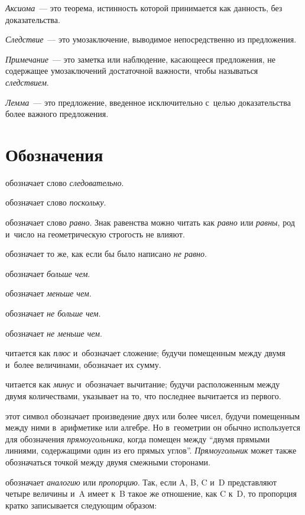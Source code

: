 \documentclass[letters,booklanguage=russian]{byrnebook}
\begin{document}
\emph{Аксиома}~— это теорема, истинность которой принимается как данность, без доказательства.

\emph{Следствие}~— это умозаключение, выводимое непосредственно из предложения.

\emph{Примечание}~— это заметка или наблюдение, касающееся предложения, не содержащее умозаключений достаточной важности, чтобы называться \emph{следствием}.

\emph{Лемма}~— это предложение, введенное исключительно с~целью доказательства более важного предложения.

\vfill\pagebreak

\chapter*{Обозначения}

\symb{$\therefore$}
 обозначает слово \emph{следовательно}.

\symb{$\because$}
 обозначает слово \emph{поскольку}.

\symb{$=$}
 обозначает слово \emph{равно}. Знак равенства можно читать как \emph{равно} или \emph{равны}, род и~число на геометрическую строгость не влияют.

\symb{$\neq$}
 обозначает то же, как если бы было написано \emph{не равно}.

\symb{$>$}
 обозначает \emph{больше чем}.

\symb{$<$}
 обозначает \emph{меньше чем}.

\symb{$\ngtr$}
 обозначает \emph{не больше чем}.

\symb{$\nless$}
 обозначает \emph{не меньше чем}.

\symb{$+$}
 читается как \emph{плюс} и~обозначает сложение; будучи помещенным между двумя и~более величинами, обозначает их сумму.

\symb{$-$}
 читается как \emph{минус} и~обозначает вычитание; будучи расположенным между двумя количествами, указывает на то, что последнее вычитается из первого.

\symb{$\times$}
 этот символ обозначает произведение двух или более чисел, будучи помещенным между ними в~арифметике или алгебре. Но в~геометрии он обычно используется для обозначения \emph{прямоугольника}, когда помещен между \enquote{двумя прямыми линиями, содержащими один из его прямых углов}. \emph{Прямоугольник} может также обозначаться точкой между двумя смежными сторонами.

\symb{$:\ ::\ :$}
 обозначает \emph{аналогию} или \emph{пропорцию}. Так, если A, B, C и~D представляют четыре величины и~A имеет к~B такое же отношение, как C к~D, то пропорция кратко записывается следующим образом:
\end{document}
